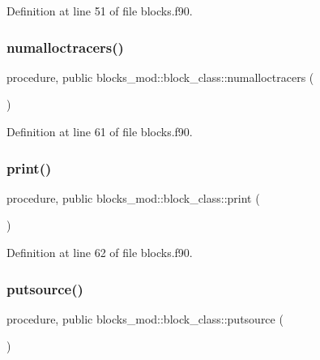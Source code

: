 Definition at line 51 of file blocks.\+f90.

\mbox{\label{structblocks__mod_1_1block__class_a7a3f2eb6823a683a6aaa2159b50ee990}} 
\subsubsection{\texorpdfstring{numalloctracers()}{numalloctracers()}}
{\footnotesize\ttfamily procedure, public blocks\+\_\+mod\+::block\+\_\+class\+::numalloctracers (\begin{DoxyParamCaption}{ }\end{DoxyParamCaption})}



Definition at line 61 of file blocks.\+f90.

\mbox{\label{structblocks__mod_1_1block__class_a43b4c133934eaadb55d30cf834d1e28c}} 
\subsubsection{\texorpdfstring{print()}{print()}}
{\footnotesize\ttfamily procedure, public blocks\+\_\+mod\+::block\+\_\+class\+::print (\begin{DoxyParamCaption}{ }\end{DoxyParamCaption})}



Definition at line 62 of file blocks.\+f90.

\mbox{\label{structblocks__mod_1_1block__class_ac79980e841902691a06212dce50f6331}} 
\subsubsection{\texorpdfstring{putsource()}{putsource()}}
{\footnotesize\ttfamily procedure, public blocks\+\_\+mod\+::block\+\_\+class\+::putsource (\begin{DoxyParamCaption}{ }\end{DoxyParamCaption})}



